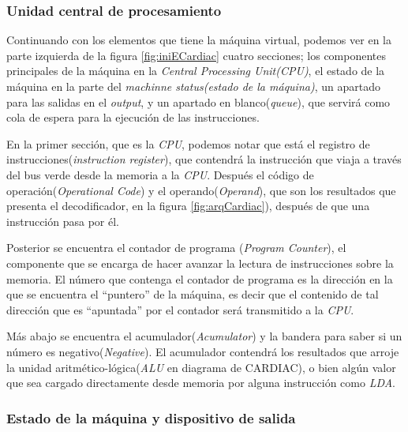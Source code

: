 \documentclass[letterpaper,12pt,oneside]{book}
\begin{document}
	
    \subsubsection{Unidad central de procesamiento}
    
	Continuando con los elementos que tiene la máquina virtual, podemos ver en la parte izquierda de la figura \ref{fig:iniECardiac}  cuatro secciones; los
	componentes principales de la máquina en la
	\textit{Central Processing Unit(CPU)}, el estado de la máquina en la parte del \textit{machinne status(estado de la máquina)}, un apartado para las salidas en el \textit{output}, y un apartado en 
	blanco(\textit{queue}), que servirá como cola de espera para la ejecución de las instrucciones.
 
    En la primer sección, que es la \textit{CPU}, podemos notar que está el
	registro de instrucciones(\textit{instruction register}), que contendrá la instrucción que viaja a través del bus verde desde la memoria a la \textit{CPU}. Después el 
	código de operación(\textit{Operational Code}) y el operando(\textit{Operand}), que son los resultados que presenta el decodificador, en la figura
	\ref{fig:arqCardiac}), después de que una instrucción pasa por él.
 
    Posterior se encuentra el contador de programa (\textit{Program Counter}), el componente que se 
	encarga de hacer avanzar la lectura de instrucciones sobre la memoria. El número que contenga el contador de programa es la dirección en la que se encuentra
	el ``puntero'' de la máquina, es decir que el contenido de tal dirección que es ``apuntada'' por el contador será transmitido a la \textit{CPU}.
 
    Más abajo se
	encuentra el acumulador(\textit{Acumulator}) y la bandera para saber si un número es negativo(\textit{Negative}). El acumulador contendrá los resultados que arroje
	la unidad aritmético-lógica(\textit{ALU} en diagrama de CARDIAC), o bien algún valor que sea cargado directamente desde memoria por alguna instrucción como \textit{LDA}.                                                                                                                                                                                                                                                                                      \subsubsection{Estado de la máquina y dispositivo de salida}                                         
	
\end{document}
